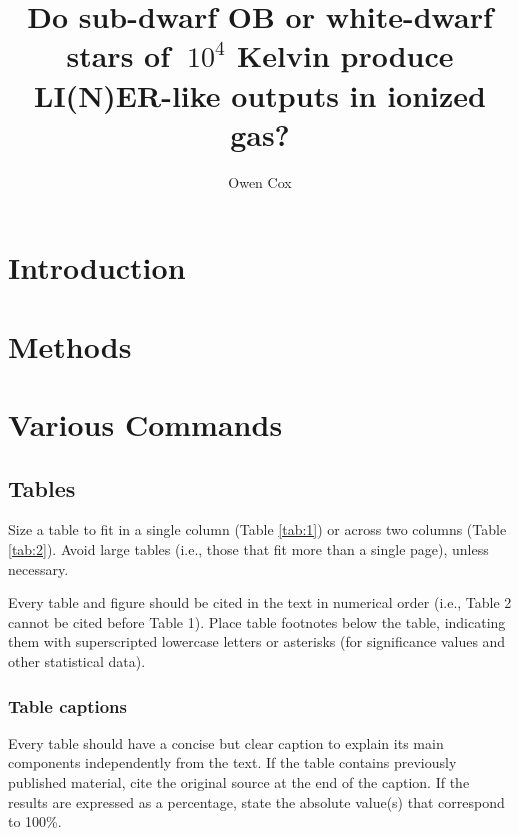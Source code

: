 \documentclass[twocolumn]{sintr}
\title{Do sub-dwarf OB or white-dwarf stars of $ ~10^{4} $ Kelvin produce LI(N)ER-like outputs in ionized gas?}
\author[1]{Owen Cox}
\affil[1]{1F5 - AB2, Department of Physics, Owen Cox}
\affil[$\mbox{*}$]{Corresponding author: \href{mailto:o_cox@coloradocollege.edu}{o\_cox@coloradocollege.edu}}
\begin{document}
\setcounter{page}{1}
\maketitle

\thispagestyle{firststyle}

\section{Introduction}



\section{Methods}



\section{Various Commands}
\subsection{Tables}

Size a table to fit in a single column (Table \ref{tab:1}) or across two columns (Table \ref{tab:2}). Avoid large tables (i.e., those that fit more than a single page), unless necessary.

Every table and figure should be cited in the text in numerical order (i.e., Table 2 cannot be cited before Table 1). Place table footnotes below the table, indicating them with superscripted lowercase letters or asterisks (for significance values and other statistical data).

%
%
%

\subsubsection{Table captions}
Every table should have a concise but clear caption to explain its main components independently from the text. If the table contains previously published material, cite the original source at the end of the caption. If the results are expressed as a percentage, state the absolute value(s) that correspond to 100\%.
\end{document}
